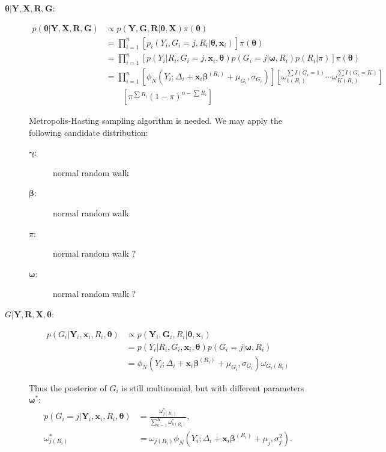 \begin{description}
\item[$\bm \theta|\bm Y, \bm X, \bm R, \bm G$:]

\begin{align*}
p(\bm \theta|\bm Y, \bm X, \bm R, \bm G) & \propto p(\bm Y, \bm G, \bm R|\bm\theta, \bm X) \pi(\bm \theta)                                                              \\
                                         & = \prod_{i=1}^n \left[ p_i(Y_i, G_i = j, R_i | \bm \theta, \bm x_i) \right] \pi(\bm \theta)                                \\
                                         & = \prod_{i=1}^n \left[ p(Y_i|R_i, G_i = j, \bm x_i, \bm \theta) p(G_i = j | \bm \omega, R_i) p(R_i|\pi) \right] \pi(\bm \theta) \\
                                         & = \prod_{i=1}^n \left[ \phi_N(Y_i; \Delta_i+\bm x_i\bm \beta^{(R_i)}+\mu_{G_i}, \sigma_{G_i})\right] \left[ \omega_{1(R_i)}^{\sum I(G_i=1)} \cdots \omega_{K(R_i)}^{\sum I(G_i=K)} \right] \\
& \qquad  \left[ \pi^{\sum R_i} (1 - \pi)^{n - \sum R_i} \right]
\end{align*}

Metropolis-Hasting sampling algorithm is needed. We may apply the following candidate distribution:
\begin{description}
\item[$\bm \gamma$: ] normal random walk
\item[$\bm \beta$: ]  normal random walk
\item[$\pi$:] normal random walk ?
\item[$\bm \omega$: ] normal random walk ?
\end{description}

\item[$G | \bm Y, \bm R, \bm X, \bm \theta$:]

\begin{align*}
p(G_i|\bm Y_i, \bm x_i, R_i, \bm \theta) & \propto p(\bm Y_i, \bm G_i,  R_i|\bm\theta, \bm x_i)           \\
                                         & = p(Y_i|R_i, G_i, \bm x_i, \bm \theta) p(G_i = j | \bm \omega, R_i) \\
                                         & = \phi_N(Y_i; \Delta_i+\bm x_i\bm \beta^{(R_i)}+\mu_{G_i}, \sigma_{G_i}) \omega_{G_i(R_i)}
\end{align*}

Thus the posterior of $G_i$ is still multinomial, but with different parameters $\bm \omega^{*}$:
\begin{align*}
p(G_i = j | \bm Y_i, \bm x_i, R_i, \bm \theta) & = \frac{\omega_{j(R_i)}^{*}}{\sum_{k=1}^K \omega_{k(R_i)}^{*}}, \\
\omega_{j(R_i)}^{*}                                   & = \omega_{j(R_i)} \phi_N(Y_i; \Delta_i + \bm x_i \bm \beta^{(R_i)} + \mu_j, \sigma_j^2).
\end{align*}
\end{description}


